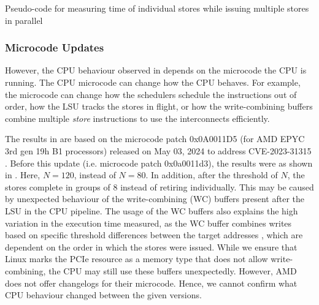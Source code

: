 \begin{minipage}{\textwidth}

\captionsetup{type=lstlisting}
\caption{Pseudo-code for measuring time of individual stores while issuing multiple stores in parallel}
\label{lst:measuring-time}
\end{minipage}

\subsubsection{Microcode Updates}
\label{subsubsec:interconnect-sc-store-ops-challenges-microcode-updates}
However, the CPU behaviour observed in  depends on the microcode the CPU is running.
The CPU microcode can change how the CPU behaves.
For example, the microcode can change how the schedulers schedule the instructions out of order, how the LSU tracks the stores in flight, or how the write-combining buffers combine multiple \textit{store} instructions to use the interconnects efficiently.

The results in  are based on the microcode patch 0x0A0011D5 (for AMD EPYC 3rd gen 19h B1 processors) released on May 03, 2024 to address CVE-2023-31315 \cite{amd_microcode_update}.
Before this update (i.e. microcode patch 0x0a0011d3), the results were as shown in .
Here, $N = 120$, instead of $N = 80$. 
In addition, after the threshold of $N$, the stores complete in groups of $8$ instead of retiring individually.
This may be caused by unexpected behaviour of the write-combining (WC) buffers present after the LSU in the CPU pipeline.
The usage of the WC buffers also explains the high variation in the execution time measured, as the WC buffer combines writes based on specific threshold differences between the target addresses \cite{amd_7003_software_optimization_guide}, which are dependent on the order in which the stores were issued.
While we ensure that Linux marks the PCIe resource as a memory type that does not allow write-combining, the CPU may still use these buffers unexpectedly.
However, AMD does not offer changelogs for their microcode.
Hence, we cannot confirm what CPU behaviour changed between the given versions.


